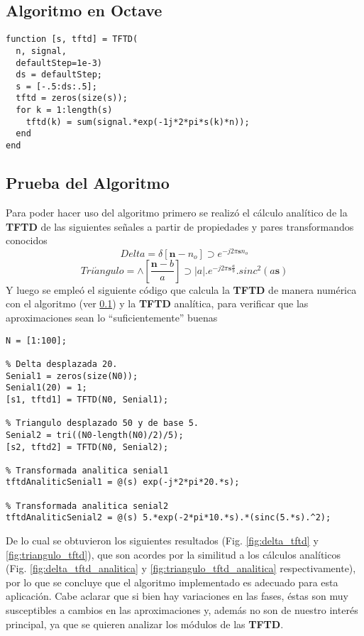 \documentclass[letterpaper, 10 pt, conference]{ieeeconf}  %
\begin{document}
\subsection{Algoritmo en Octave}
\label{tftd_function}
\nopagebreak
\begin{lstlisting}[style=Matlab-editor] 
function [s, tftd] = TFTD(
  n, signal,
  defaultStep=1e-3)
  ds = defaultStep;
  s = [-.5:ds:.5];
  tftd = zeros(size(s));
  for k = 1:length(s)
    tftd(k) = sum(signal.*exp(-1j*2*pi*s(k)*n));
  end
end
\end{lstlisting}

\subsection{Prueba del Algoritmo}
Para poder hacer uso del algoritmo primero se realiz\'o el c\'alculo analítico de la \textbf{TFTD} de las siguientes se\~{n}ales a partir de propiedades y pares transformandos conocidos
\[
  Delta = \delta[\textbf{n}-n_o] \supset e^{-j2{\pi}\textbf{s}n_o}
\]
\[
  Tri\acute{a}ngulo = \wedge[\frac{\textbf{n}-b}{a}] \supset |a|.e^{-j2{\pi}\textbf{s}\frac{a}{b}}.sinc^2(a\textbf{s})
\]
Y luego se emple\'o el siguiente c\'odigo que calcula la \textbf{TFTD} de manera num\'erica con el algoritmo (ver \ref{tftd_function}) y la \textbf{TFTD} anal\'itica, para verificar que las aproximaciones sean lo ``suficientemente'' buenas

\begin{lstlisting}[style=Matlab-editor]
N = [1:100];

% Delta desplazada 20.
Senial1 = zeros(size(N0));
Senial1(20) = 1;
[s1, tftd1] = TFTD(N0, Senial1);

% Triangulo desplazado 50 y de base 5.
Senial2 = tri((N0-length(N0)/2)/5);
[s2, tftd2] = TFTD(N0, Senial2);

% Transformada analitica senial1
tftdAnaliticSenial1 = @(s) exp(-j*2*pi*20.*s);

% Transformada analitica senial2
tftdAnaliticSenial2 = @(s) 5.*exp(-2*pi*10.*s).*(sinc(5.*s).^2);

\end{lstlisting}

De lo cual se obtuvieron los siguientes resultados (Fig. \ref{fig:delta_tftd} y \ref{fig:triangulo_tftd}), que son acordes por la similitud a los c\'alculos analíticos (Fig. \ref{fig:delta_tftd_analitica} y \ref{fig:triangulo_tftd_analitica} respectivamente), por lo que se concluye que el algoritmo implementado es adecuado para esta aplicaci\'on. Cabe aclarar que si bien hay variaciones en las fases, \'estas son muy susceptibles a cambios en las aproximaciones y, adem\'as no son de nuestro inter\'es principal, ya que se quieren analizar los m\'odulos de las \textbf{TFTD}.
\end{document}
